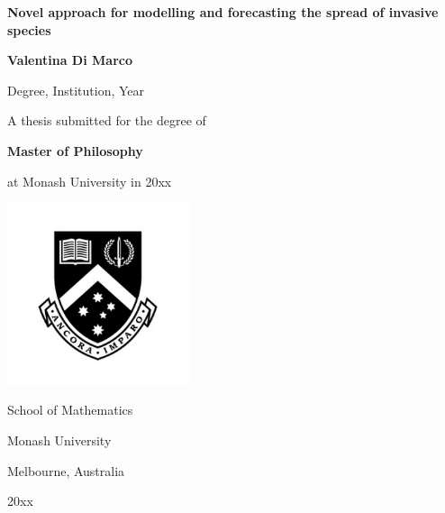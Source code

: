 \begin{titlepage}
  \begin{center}
    \vspace*{\fill}

\begin{center}
    { %
      \textbf{
        \Large Novel approach for modelling and forecasting the spread of invasive species
              } 
    }
\end{center}
    
    \vspace{2cm}
    
    {
      \Large
      \textbf{Valentina Di Marco}
    }

    \vspace{0.3cm}
    
    {
      \normalsize
      Degree, Institution, Year
      
    }
    
    \vspace{3cm}

    {
      \large
      A thesis submitted for the degree of

      \vspace{0.25cm}
      
      \textbf{Master of Philosophy}

      \vspace{0.25cm}
      
      at Monash University in 20xx
    }
    
    \vspace{2.5cm}

    {
      \includegraphics[width=0.4\textwidth]{monash-logo}
    }

    {
      School of Mathematics
      
      Monash University
      
      Melbourne, Australia
      
      20xx
    }
    
    \vspace*{\fill}
  \end{center}
\end{titlepage}

\clearpage
